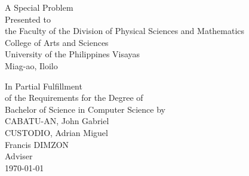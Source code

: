 \begin{titlepage}
\begin{singlespace}
\centering

 \begin{spacing}{1.5}
\end{spacing}

\vspace{1.75cm}
A Special Problem\\
Presented to\\
the Faculty of the Division of Physical Sciences and Mathematics\\
College of Arts and Sciences\\
University of the Philippines Visayas\\
Miag-ao, Iloilo

\vspace{1.75cm}
In Partial Fulfillment\\
of the Requirements for the Degree of\\
Bachelor of Science in Computer Science
\vspace{1.75cm}
by\\

\vspace{1cm}
CABATU-AN, John Gabriel  \\
CUSTODIO, Adrian Miguel  \\


\vspace{1.75cm}
Francis DIMZON\\
Adviser\\

\vspace{1.75cm}
\today
\end{singlespace}
\end{titlepage}
